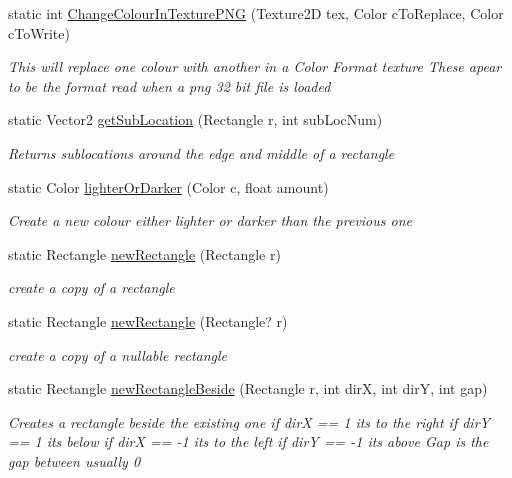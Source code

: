 \begin{DoxyCompactItemize}
static int \mbox{\hyperlink{class_r_c___framework_1_1_util_afe33a070b0b4b808fc997b208f39cbaf}{Change\+Colour\+In\+Texture\+P\+NG}} (Texture2D tex, Color c\+To\+Replace, Color c\+To\+Write)
\begin{DoxyCompactList}\small\item\em This will replace one colour with another in a \textquotesingle{}Color\textquotesingle{} Format texture These apear to be the format read when a png 32 bit file is loaded \end{DoxyCompactList}\item 
static Vector2 \mbox{\hyperlink{class_r_c___framework_1_1_util_ac1ae1f985062d114cae845a16df70c80}{get\+Sub\+Location}} (Rectangle r, int sub\+Loc\+Num)
\begin{DoxyCompactList}\small\item\em Returns sublocations around the edge and middle of a rectangle \end{DoxyCompactList}\item 
static Color \mbox{\hyperlink{class_r_c___framework_1_1_util_a88559e70851ee1e21bdc1375b862919d}{lighter\+Or\+Darker}} (Color c, float amount)
\begin{DoxyCompactList}\small\item\em Create a new colour either lighter or darker than the previous one \end{DoxyCompactList}\item 
static Rectangle \mbox{\hyperlink{class_r_c___framework_1_1_util_a122c1990a7bfeaab7b87d9493fd5970d}{new\+Rectangle}} (Rectangle r)
\begin{DoxyCompactList}\small\item\em create a copy of a rectangle \end{DoxyCompactList}\item 
static Rectangle \mbox{\hyperlink{class_r_c___framework_1_1_util_ad3ac7d622266e8e09e88b50b50052578}{new\+Rectangle}} (Rectangle? r)
\begin{DoxyCompactList}\small\item\em create a copy of a nullable rectangle \end{DoxyCompactList}\item 
static Rectangle \mbox{\hyperlink{class_r_c___framework_1_1_util_a205f56f4b98e21666462ddce5143a2e5}{new\+Rectangle\+Beside}} (Rectangle r, int dirX, int dirY, int gap)
\begin{DoxyCompactList}\small\item\em Creates a rectangle beside the existing one if dirX == 1 its to the right if dirY == 1 its below if dirX == -\/1 its to the left if dirY == -\/1 its above Gap is the gap between usually 0 \end{DoxyCompactList}\item 

\end{DoxyCompactItemize}
